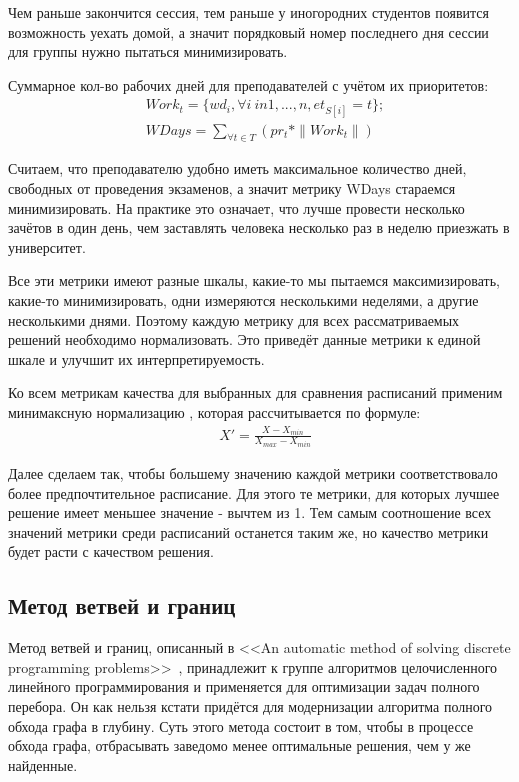 Чем раньше закончится сессия, тем раньше у иногородних студентов появится возможность уехать домой, а значит порядковый номер последнего дня сессии для группы нужно пытаться минимизировать.

Суммарное кол-во рабочих дней для преподавателей с учётом их приоритетов:
\begin{align}
	& Work_t = \{wd_i, \forall i \ in {1,...,n}, et_{S[i]} = t\};\\
	& {WDays} =  \sum\limits_{\forall  t \in T}(pr_t * \|Work_t\|) 
\end{align}

Считаем, что преподавателю удобно иметь максимальное количество дней, свободных от проведения экзаменов, а значит метрику WDays стараемся минимизировать. На практике это означает, что лучше провести несколько зачётов в один день, чем заставлять человека несколько раз в неделю приезжать в университет.

Все эти метрики имеют разные шкалы, какие-то мы пытаемся максимизировать, какие-то минимизировать, одни измеряются несколькими неделями, а другие несколькими днями. Поэтому каждую метрику для всех рассматриваемых решений необходимо нормализовать. Это приведёт данные метрики к единой шкале и улучшит их интерпретируемость.

Ко всем метрикам качества для выбранных для сравнения расписаний применим минимаксную нормализацию \cite{minimax}, которая рассчитывается по формуле:
\begin{align}
	& X' =  \frac{X-X_{min}}{X_{max}-X_{min}}
\end{align}

Далее сделаем так, чтобы большему значению каждой метрики соответствовало более предпочтительное расписание. Для этого те метрики, для которых лучшее решение имеет меньшее значение - вычтем из 1. Тем самым соотношение всех значений метрики среди расписаний останется таким же, но качество метрики будет расти с качеством решения. 

\subsection{Метод ветвей и границ}
Метод ветвей и границ, описанный в <<An automatic method of solving discrete programming problems>>~\cite{branch}, принадлежит к группе алгоритмов целочисленного линейного программирования и применяется для оптимизации задач полного перебора. Он как нельзя кстати придётся для модернизации алгоритма полного обхода графа в глубину.
Суть этого метода состоит в том, чтобы в процессе обхода графа, отбрасывать заведомо менее оптимальные решения, чем у же найденные.

